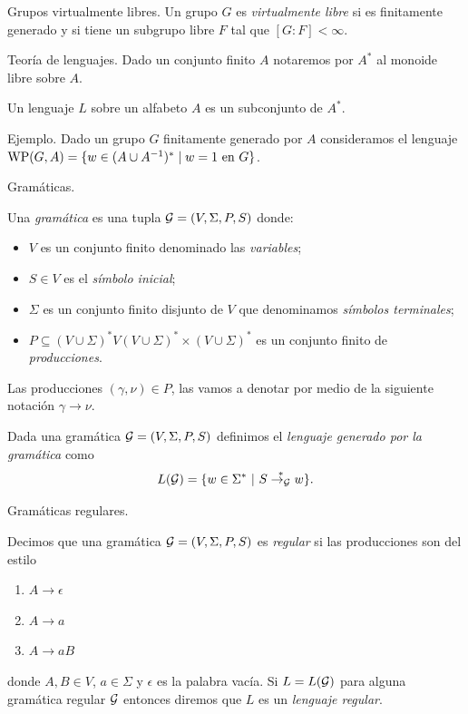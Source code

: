 \documentclass[aspectratio=169, 11pt]{beamer}
\begin{document}
	\begin{frame}[fragile]{Grupos virtualmente libres.}
		Un grupo $G$ es \emph{virtualmente libre} si es finitamente generado y si
	tiene un subgrupo libre $F$ tal que $[G:F] < \infty$.
	\end{frame}

	\begin{frame}[fragile]{Teoría de lenguajes.}
		Dado un conjunto finito $A$ notaremos por $A^*$ al monoide libre sobre $A$.
		
		\begin{deff}
			Un lenguaje $L$ sobre un alfabeto $A$ es un subconjunto de $A^*$.
		\end{deff}	
		
		\alert{Ejemplo.}
			Dado un grupo $G$ finitamente generado por $A$ consideramos el lenguaje $\text{WP}(G, A) = \{ w \in (A \cup A^{-1})^{*} \mid w = 1 \ \text{en $G$} \}$.

	\end{frame}
	
	\begin{frame}[fragile]{Gramáticas.}
		\begin{deff}
			Una \emph{gramática} es una tupla ${\cal G} = (V, \Sigma, P, S)$ donde:
			\begin{itemize}
				\item $V$ es un conjunto finito denominado las \emph{variables};
				\item $S \in V$ es el \emph{símbolo inicial};
				\item $\Sigma$ es un conjunto finito disjunto de $V$ que denominamos \emph{símbolos terminales};
				\item $P \subseteq (V \cup \Sigma)^*V(V \cup \Sigma)^* \times (V \cup \Sigma)^*$ es un conjunto finito de \emph{producciones}.
			\end{itemize}
		\end{deff}

		Las producciones $(\gamma, \nu) \in P$, las vamos a denotar por medio de la siguiente notación $\gamma \to \nu$.


		\begin{deff}
			Dada una gramática ${\cal G} = (V, \Sigma, P, S)$  definimos el \emph{lenguaje generado por la gramática} como
			\[
			L({\cal G}) = \{ w \in \Sigma^* \ | \ S \overset{*}{\to_{\cal G}} w   \}.
			\]
		\end{deff}
	\end{frame}
	
	\begin{frame}{Gramáticas regulares.}
		\begin{deff}
			Decimos que una gramática ${\cal G} = (V, \Sigma, P, S)$ es \emph{regular} si las producciones son del estilo
	\begin{enumerate}
		\item $A \to \epsilon$
		\item $A \to a$
		\item $A \to a B$
	\end{enumerate}
	donde $A, B \in V$, $a \in \Sigma$ y $\epsilon$ es la palabra vacía. 
	Si $L=L({\cal G})$ para alguna gramática regular $\cal G$ entonces diremos que $L$ es un \emph{lenguaje regular}.
		\end{deff}
	\end{frame}
\end{document}
